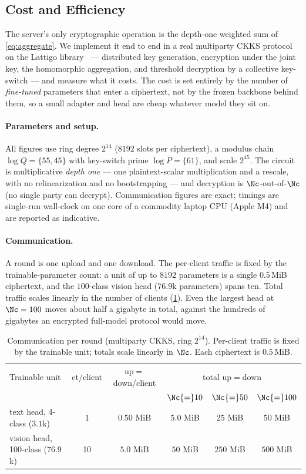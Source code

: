 \subsection{Cost and Efficiency}
\label{sec:fhe-cost}

The server's only cryptographic operation is the depth-one weighted sum of \cref{eq:aggregate}. We implement
it end to end in a real multiparty CKKS protocol on the Lattigo library~\cite{lattigo,mouchet2021multiparty}
--- distributed key generation, encryption under the joint key, the homomorphic aggregation, and threshold
decryption by a collective key-switch --- and measure what it costs. The cost is set entirely by the number
of \emph{fine-tuned} parameters that enter a ciphertext, not by the frozen backbone behind them, so a small
adapter and head are cheap whatever model they sit on.

\paragraph{Parameters and setup.} All figures use ring degree $2^{14}$ ($8192$ slots per ciphertext), a
modulus chain $\log Q=\{55,45\}$ with key-switch prime $\log P=\{61\}$, and scale $2^{45}$. The circuit is
multiplicative \emph{depth one} --- one plaintext-scalar multiplication and a rescale, with no relinearization
and no bootstrapping --- and decryption is $\Nc$-out-of-$\Nc$ (no single party can decrypt). Communication
figures are exact; timings are single-run wall-clock on one core of a commodity laptop CPU (Apple M4) and are
reported as indicative.

\paragraph{Communication.} A round is one upload and one download. The per-client traffic is fixed by the
trainable-parameter count: a unit of up to $8192$ parameters is a single $0.5$\,MiB ciphertext, and the
$100$-class vision head ($76.9$k parameters) spans ten. Total traffic scales linearly in the number of
clients (\cref{tab:cost-comm}). Even the largest head at $\Nc=100$ moves about half a gigabyte in total,
against the hundreds of gigabytes an encrypted full-model protocol would move.

\begin{table}[t]
\centering
\caption{Communication per round (multiparty CKKS, ring $2^{14}$). Per-client traffic is fixed by the
trainable unit; totals scale linearly in $\Nc$. Each ciphertext is $0.5$\,MiB.}
\label{tab:cost-comm}
\footnotesize
\begin{tabular}{lccccc}
\toprule
Trainable unit & ct/client & up$=$down/client & \multicolumn{3}{c}{total up$=$down} \\
 & & & $\Nc{=}10$ & $\Nc{=}50$ & $\Nc{=}100$ \\
\midrule
text head, 4-class ($3.1$k)   & 1  & $0.50$ MiB & $5.0$ MiB  & $25$ MiB  & $50$ MiB \\
vision head, 100-class ($76.9$k) & 10 & $5.0$ MiB  & $50$ MiB   & $250$ MiB & $500$ MiB \\
\bottomrule
\end{tabular}
\normalsize
\end{table}


